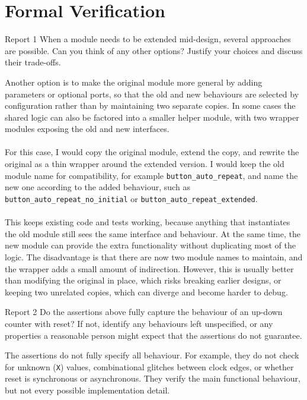\documentclass[12pt]{article}
\let\oldtexttt\texttt
\renewcommand{\texttt}[1]{{\fontsize{11pt}{12pt}\selectfont\oldtexttt{#1}}}
\begin{document}
	\newpage

\section{Formal Verification}
	\begin{reportbox}{Report 1}
		When a module needs to be extended mid-design, several approaches are possible. Can you think of any other options? Justify your choices and discuss their trade-offs.
	\end{reportbox}
	Another option is to make the original module more general by adding parameters or optional ports, so that the old and new behaviours are selected by configuration rather than by maintaining two separate copies. In some cases the shared logic can also be factored into a smaller helper module, with two wrapper modules exposing the old and new interfaces.\\
	\\
	For this case, I would copy the original module, extend the copy, and rewrite the original as a thin wrapper around the extended version. I would keep the old module name for compatibility, for example \texttt{button\_auto\_repeat}, and name the new one according to the added behaviour, such as \texttt{button\_auto\_repeat\_no\_initial} or \texttt{button\_auto\_repeat\_extended}.\\
	\\
	This keeps existing code and tests working, because anything that instantiates the old module still sees the same interface and behaviour. At the same time, the new module can provide the extra functionality without duplicating most of the logic. The disadvantage is that there are now two module names to maintain, and the wrapper
	adds a small amount of indirection. However, this is usually better than modifying the original in place, which risks breaking earlier designs, or keeping two unrelated copies, which can diverge and become harder to debug.\\
	\begin{reportbox}{Report 2}
		Do the assertions above fully capture the behaviour of an up-down counter with reset? If not, identify any behaviours left unspecified, or any properties a reasonable person might expect that the assertions do not guarantee.
	\end{reportbox}
	The assertions do not fully specify all behaviour. For example, they do
	not check for unknown (\texttt{X}) values, combinational glitches between clock edges, or whether reset is synchronous or asynchronous. They verify the main functional behaviour, but not every possible implementation detail.\\
\end{document}
